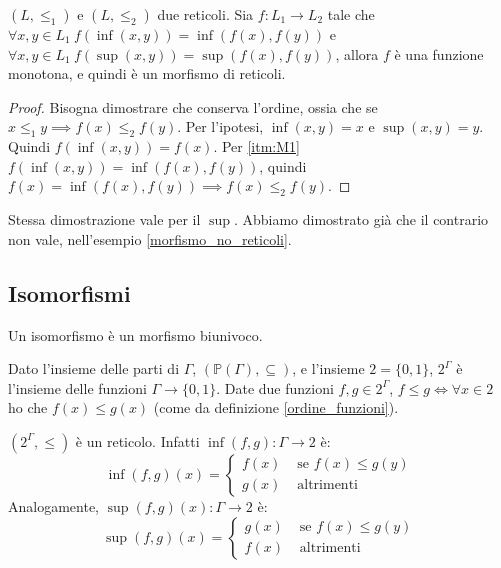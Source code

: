 \begin{prop}
$(L, \le_1)$ e $(L, \le_2)$ due reticoli. Sia $f : L_1 \to L_2$ tale che $\forall x, y \in L_1 \ f(\inf(x,y)) = \inf (f(x),f(y))$ e $\forall x, y \in L_1 \ f(\sup(x,y)) = \sup (f(x),f(y))$, allora $f$ \`e una funzione monotona, e quindi \`e un morfismo di reticoli.
\end{prop}
\begin{proof}
Bisogna dimostrare che conserva l'ordine, ossia che se $x \le_1 y \implies f(x) \le_2 f(y)$. Per l'ipotesi, $\inf(x,y) = x$ e $\sup(x,y)= y$. Quindi $f(\inf(x,y)) = f(x)$. Per \ref{itm:M1} $f(\inf(x,y)) = \inf(f(x),f(y))$, quindi $f(x) = \inf(f(x),f(y)) \implies f(x) \le_2 f(y)$.
\end{proof}
Stessa dimostrazione vale per il $\sup$. Abbiamo dimostrato gi\`a che il contrario non vale, nell'esempio \ref{morfismo_no_reticoli}.

\subsection{Isomorfismi}
Un isomorfismo \`e un morfismo biunivoco.

Dato l'insieme delle parti di $\Gamma$, $(\mathbb{P}(\Gamma), \subseteq)$, e l'insieme $2 = \{ 0, 1 \}$, $2^{\Gamma}$ \`e l'insieme delle funzioni $\Gamma \to \{0,1\}$. Date due funzioni $f, g \in 2^{\Gamma}$, $f \le g \iff \forall x \in 2 $ ho che $ f(x) \le g(x)$ (come da  definizione \ref{ordine_funzioni}). 

$(2^{\Gamma}, \le)$ \`e un reticolo. Infatti $\inf(f,g) : \Gamma \to 2$ \`e:
\[
\inf(f,g)(x) = 
\begin{cases}
f(x) & \text{ se } f(x) \le g(y) \\
g(x) & \text{ altrimenti}
\end{cases}
\]
Analogamente, $\sup(f,g)(x) : \Gamma \to 2$ \`e:
\[
\sup(f,g)(x) = 
\begin{cases}
g(x) & \text{ se } f(x) \le g(y) \\
f(x) & \text{ altrimenti}
\end{cases}
\]

